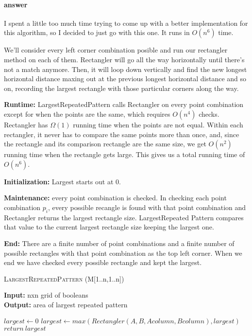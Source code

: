 \documentclass{article}
\begin{document}
\paragraph{answer}

I spent a little too much time trying to come up with a better implementation for this algorithm,
so I decided to just go with this one. It runs in $O(n^{6})$ time.

We'll consider every left corner combination posible and run our rectangler method on each of them.
Rectangler will go all the way horizontally until there's not a match anymore. Then, it will loop down vertically and find the new longest horizontal distance maxing out at the previous longest horizontal distance and so on, recording the largest rectangle with those particular corners along the way.

{\bf Runtime:} LargestRepeatedPattern calls Rectangler on every point combination except for when the points are the same, which requires $O(n^{4})$ checks. Rectangler has $\Omega(1)$ running time when the points are not equal. Within each rectangler, it never has to compare the same points more than once, and, since the rectangle and its comparison rectangle are the same size, we get $O(n^{2})$ running time when the rectangle gets large. This gives us a total running time of $O(n^{6})$.

{\bf Initialization:} Largest starts out at 0.

{\bf Maintenance:} every point combination is checked. In checking each point combination $p_{i}$, every possible recangle is found with that point combination and Rectangler returns the largest rectangle size. LargestRepeated Pattern compares that value to the current largest rectangle size keeping the largest one.

{\bf End:} There are a finite number of point combinations and a finite number of possible rectangles with that point combination as the top left corner. When we end we have checked every possible rectangle and kept the largest.

\begin{algorithm} \caption{\textsc{LargestRepeatedPattern} (M[1..n,1..n])}\label{alg:seb}
    {\bf Input:} nxn grid of booleans\\
    {\bf Output:} area of largest repeated pattern
    \begin{algorithmic}[1]
        \State$largest \gets 0$
                            \State$largest \gets max(Rectangler(A, B, Acolumn, Bcolumn), largest)$
                        \EndIf{}
                    \EndFor{}
                \EndFor{}
            \EndFor{}
        \EndFor{}
        \State$return\ largest$
    \end{algorithmic}
\end{algorithm}
\end{document}
